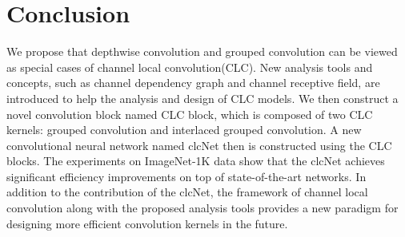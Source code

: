 \documentclass[10pt,twocolumn,letterpaper]{article}
\begin{document}
\section{Conclusion}
We propose that depthwise convolution and grouped convolution can be viewed as special cases of channel local convolution(CLC). New analysis tools and concepts, such as channel dependency graph and channel receptive field, are introduced to help the analysis and design of CLC models. We then construct a novel convolution block named CLC block, which is composed of two CLC kernels: grouped convolution and interlaced grouped convolution. A new convolutional neural network named clcNet then is constructed using the CLC blocks. The experiments on ImageNet-1K data show that the clcNet achieves significant efficiency improvements on top of state-of-the-art networks. In addition to the contribution of the clcNet, the framework of channel local convolution along with the proposed analysis tools provides a new paradigm for designing more efficient convolution kernels in the future. 

\small


\end{document}
